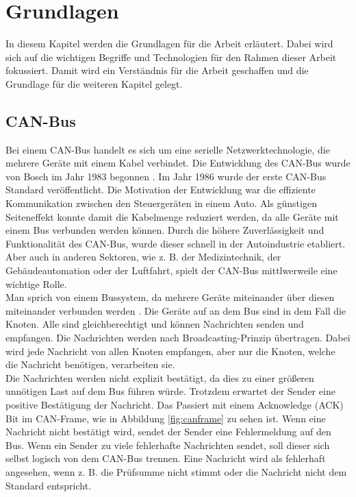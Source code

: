 \chapter{Grundlagen}


In diesem Kapitel werden die Grundlagen für die Arbeit erläutert.
Dabei wird sich auf die wichtigen Begriffe und Technologien für den Rahmen dieser Arbeit fokussiert.
Damit wird ein Verständnis für die Arbeit geschaffen und die Grundlage für die weiteren Kapitel gelegt.

\section{CAN-Bus}
Bei einem CAN-Bus handelt es sich um eine serielle Netzwerktechnologie, 
die mehrere Geräte mit einem Kabel verbindet.
Die Entwicklung des CAN-Bus wurde von Bosch im Jahr 1983 begonnen \cite[Seiten 2--10]{Voss2008}. 
Im Jahr 1986 wurde der erste CAN-Bus Standard 
veröffentlicht.
Die Motivation der Entwicklung war die effiziente Kommunikation zwischen den Steuergeräten in einem Auto. 
Als günstigen
Seiteneffekt konnte damit die Kabelmenge reduziert werden, da alle Geräte mit einem Bus verbunden werden können.
Durch die höhere Zuverlässigkeit und Funktionalität des CAN-Bus, wurde dieser schnell in der Autoindustrie etabliert.
Aber auch in anderen Sektoren, wie z. B. der Medizintechnik, der Gebäudeautomation oder der Luftfahrt, spielt der
CAN-Bus mittlwerweile eine wichtige Rolle.
\\
Man sprich von einem Bussystem, da mehrere Geräte miteinander über diesen miteinander verbunden werden \cite[Seiten 13--19]{Voss2008}. 
Die Geräte auf an dem Bus sind in dem Fall die Knoten. Alle sind gleichberechtigt und können Nachrichten senden und empfangen.
Die Nachrichten werden nach Broadcasting-Prinzip übertragen. Dabei wird jede Nachricht von allen Knoten empfangen, 
aber nur die Knoten, welche die Nachricht benötigen, verarbeiten sie. \\
Die Nachrichten werden nicht explizit bestätigt, da dies zu einer größeren unnötigen Last auf dem Bus führen würde.
Trotzdem erwartet der Sender eine positive Bestätigung der Nachricht. Das Passiert mit einem Acknowledge (ACK) Bit 
im CAN-Frame, wie in Abbildung \ref{fig:canframe} zu sehen ist. Wenn eine Nachricht nicht bestätigt wird, 
sendet der Sender eine Fehlermeldung auf den Bus. Wenn ein Sender zu viele fehlerhafte Nachrichten sendet, soll
dieser sich selbst logisch von dem CAN-Bus trennen. Eine Nachricht wird als fehlerhaft angesehen, wenn z. B. die Prüfsumme
nicht stimmt oder die Nachricht nicht dem Standard entspricht.

